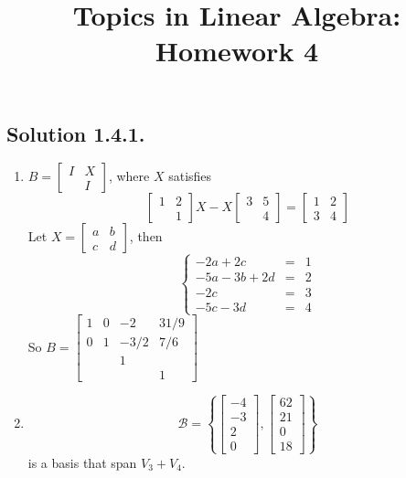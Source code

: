 \documentclass{article}
\title{Topics in Linear Algebra: Homework 4}
\begin{document}
\maketitle
\subsection*{Solution 1.4.1.}
\begin{enumerate}
    \item 
    $B=\left[
    \begin{array}{cc}
    I & X \\
         & I
    \end{array}
    \right]$, where $X$ satisfies 
    \[\left[
    \begin{array}{cc}
    1 & 2 \\
      & 1
    \end{array}
    \right]X-X\left[
    \begin{array}{cc}
    3 & 5 \\
      & 4
    \end{array}
    \right]=\left[
    \begin{array}{cc}
    1 & 2 \\
    3 & 4
    \end{array}
    \right]\]
    Let $X=\left[
    \begin{array}{cc}
    a & b \\
    c & d
    \end{array}
    \right]$, then
    \[\left\{\begin{array}{lcc}
    -2a+2c & = & 1 \\
    -5a-3b+2d  & = & 2\\
    -2c & = & 3\\
    -5c-3d & = & 4
    \end{array}\right.\]
    So $B=\left[
    \begin{array}{cccc}
    1 & 0 & -2 & 31/9 \\
    0 & 1 & -3/2 & 7/6 \\
    &&1\\
    &&&1
    \end{array}
    \right]$
    \item 
    \[\mathcal{B}=\left\{
    \left[
    \begin{array}{c} -4\\-3\\2\\0
    \end{array}
    \right],
    \left[
    \begin{array}{c} 62\\21\\0\\18
    \end{array}
    \right]
    \right\}\]
    is a basis that span $V_3+V_4$.
\end{enumerate}
\end{document}
